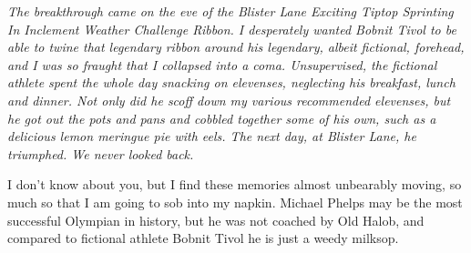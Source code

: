 \emph{The breakthrough came on the eve of the Blister Lane Exciting Tiptop Sprinting In Inclement Weather Challenge Ribbon. I desperately wanted Bobnit Tivol to be able to twine that legendary ribbon around his legendary, albeit fictional, forehead, and I was so fraught that I collapsed into a coma. Unsupervised, the fictional athlete spent the whole day snacking on elevenses, neglecting his breakfast, lunch and dinner. Not only did he scoff down my various recommended elevenses, but he got out the pots and pans and cobbled together some of his own, such as a delicious lemon meringue pie with eels. The next day, at Blister Lane, he triumphed. We never looked back.}

I don't know about you, but I find these memories almost unbearably moving, so much so that I am going to sob into my napkin. Michael Phelps may be the most successful Olympian in history, but he was not coached by Old Halob, and compared to fictional athlete Bobnit Tivol he is just a weedy milksop.

